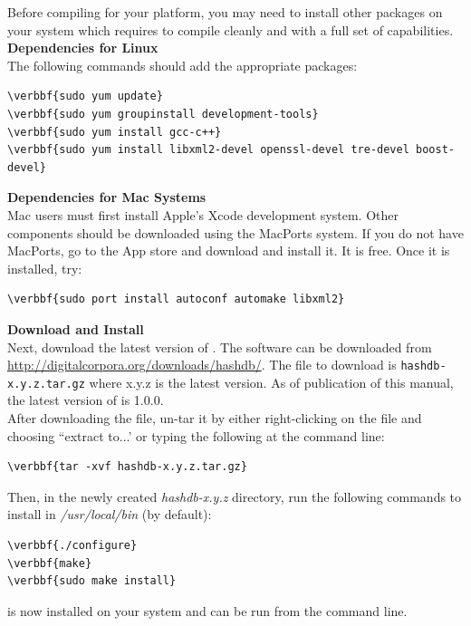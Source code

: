 \documentclass[11pt,fleqn]{article} %
\begin{document}
Before compiling \hash for your platform, you may need to install other packages on your system which \hash requires to compile cleanly and with a full set of capabilities.\\

\textbf{Dependencies for Linux}\\
The following commands should add the appropriate packages:
\begin{Verbatim}[commandchars=\\\{\}]
\verbbf{sudo yum update}
\verbbf{sudo yum groupinstall development-tools}
\verbbf{sudo yum install gcc-c++}
\verbbf{sudo yum install libxml2-devel openssl-devel tre-devel boost-devel}
\end{Verbatim}

\textbf{Dependencies for Mac Systems}\\
Mac users must first install Apple's Xcode development system. Other components should be downloaded using the MacPorts system. If you do not have MacPorts, go to the App store and download and install it. It is free. Once it is installed, try:
\begin{Verbatim}[commandchars=\\\{\}]
\verbbf{sudo port install autoconf automake libxml2} 
\end{Verbatim}

\textbf{Download and Install \hash}\\
Next, download the latest version of \hash. The software can be downloaded from \url{http://digitalcorpora.org/downloads/hashdb/}. The file to download is \texttt{hashdb-x.y.z.tar.gz} where x.y.z is the latest version. As of publication of this manual, the latest version of \hash is 1.0.0.\\


After downloading the file, un-tar it by either right-clicking on the file and choosing ``extract to...' or typing the following at the command line:
\begin{Verbatim}[commandchars=\\\{\}]
\verbbf{tar -xvf hashdb-x.y.z.tar.gz}
\end{Verbatim}

Then, in the newly created \textit{hashdb-x.y.z} directory, run the following commands to install \hash in \textit{/usr/local/bin} (by default):

\begin{Verbatim}[commandchars=\\\{\}]
\verbbf{./configure}
\verbbf{make}
\verbbf{sudo make install}
\end{Verbatim}
\hash is now installed on your system and can be run from the command line. \\
\end{document}
